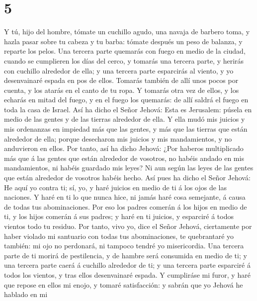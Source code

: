\hypertarget{section-4}{%
\section{5}\label{section-4}}

 Y tú, hijo del hombre, tómate un cuchillo agudo, una
navaja de barbero toma, y hazla pasar sobre tu cabeza y tu barba: tómate
después un peso de balanza, y reparte los pelos.  Una
tercera parte quemarás con fuego en medio de la ciudad, cuando se
cumplieren los días del cerco, y tomarás una tercera parte, y herirás
con cuchillo alrededor de ella; y una tercera parte esparcirás al
viento, y yo desenvainaré espada en pos de ellos.  Tomarás
también de allí unos pocos por cuenta, y los atarás en el canto de tu
ropa.  Y tomarás otra vez de ellos, y los echarás en mitad
del fuego, y en el fuego los quemarás: de allí saldrá el fuego en toda
la casa de Israel.  Así ha dicho el Señor Jehová: Esta es
Jerusalem: púsela en medio de las gentes y de las tierras alrededor de
ella.  Y ella mudó mis juicios y mis ordenanzas en
impiedad más que las gentes, y más que las tierras que están alrededor
de ella; porque desecharon mis juicios y mis mandamientos, y no
anduvieron en ellos.  Por tanto, así ha dicho Jehová: ¿Por
haberos multiplicado más que á las gentes que están alrededor de
vosotros, no habéis andado en mis mandamientos, ni habéis guardado mis
leyes? Ni aun según las leyes de las gentes que están alrededor de
vosotros habéis hecho.  Así pues ha dicho el Señor Jehová:
He aquí yo contra ti; sí, yo, y haré juicios en medio de ti á los ojos
de las naciones.  Y haré en ti lo que nunca hice, ni jamás
haré cosa semejante, á causa de todas tus abominaciones. 
Por eso los padres comerán á los hijos en medio de ti, y los hijos
comerán á sus padres; y haré en ti juicios, y esparciré á todos vientos
todo tu residuo.  Por tanto, vivo yo, dice el Señor
Jehová, ciertamente por haber violado mi santuario con todas tus
abominaciones, te quebrantaré yo también: mi ojo no perdonará, ni
tampoco tendré yo misericordia.  Una tercera parte de ti
morirá de pestilencia, y de hambre será consumida en medio de ti; y una
tercera parte caerá á cuchillo alrededor de ti; y una tercera parte
esparciré á todos los vientos, y tras ellos desenvainaré espada.
 Y cumpliráse mi furor, y haré que repose en ellos mi
enojo, y tomaré satisfacción: y sabrán que yo Jehová he hablado en mi
